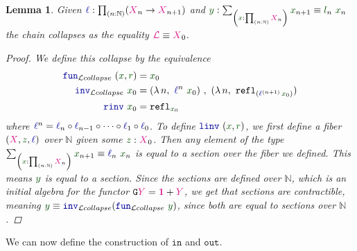 \documentclass[twoside,11pt,openright]{report}
\theoremstyle{plain} %
\newtheorem{lem}[thm]{Lemma}
\theoremstyle{definition}
\theoremstyle{remark}
\newcommand*{\term}[1]{\textcolor{green!30!black}{#1}} %
\newcommand*{\pathterm}[1]{\textcolor{green!40!black}{#1}}
\newcommand*{\type}[1]{\textcolor{magenta!90!black}{#1}}
\newcommand*{\unit}{\type{\textbf{1}}}
\newcommand*{\function}[1]{\textcolor{blue!60!black}{\ensuremath{\mathtt{#1}}}}
\newcommand*{\functor}[1]{\ensuremath{\mathbf{\mathtt{#1}}}}
\begin{document}
\begin{lem}\label{lem:limit-collapse}
  Given \(\function{\ell} : \prod_{(n : \mathbb{N})} (\type{X}_{n} \rightarrow \type{X}_{n+1})\) and \(\term{y} : \sum_{\left(\term{x} : \prod_{(n : \mathbb{N})} \type{X}_n\right)} \term{x}_{n + 1} \equiv \term{l}_n~\term{x}_n\) the chain collapses as the equality \(\type{\mathcal{L}} \equiv \type{X}_0\).
  \begin{proof}
    We define this collapse by the equivalence
    \begin{align}
      \function{fun}_{\mathcal{L}collapse}~(\term{x} , \pathterm{r}) &= \term{x}_0 \\
      \function{inv}_{\mathcal{L}collapse}~\term{x}_0 &= (\lambda\,n,~\function{\ell}^n~\term{x}_0)~,~(\lambda\,n,~\mathtt{refl}_{(\function{\ell}^{(n+1)}\,\term{x}_0)}) \\
      \function{rinv}~\term{x}_0 &= \mathtt{refl}_{\term{x}_0}
    \end{align}
    where \(\function{\ell}^n = \function{\ell}_n \circ \function{\ell}_{n-1} \circ \dots \circ \function{\ell}_1 \circ \function{\ell}_0\). To define \(\function{linv}~(\term{x} , \pathterm{r})\), we first define a fiber \((\type{X} , \term{z}, \function{\ell})\) over \(\mathbb{N}\) given some \(\term{z} : \type{X}_0\). Then any element of the type \(\sum_{\left(\term{x} : \prod_{(n : \mathbb{N})} \type{X}_n\right)} \term{x}_{n + 1} \equiv \function{\ell}_n~\term{x}_n\) is equal to a section over the fiber we defined. This means \(\term{y}\) is equal to a section. Since the sections are defined over \(\mathbb{N}\), which is an initial algebra for the functor \(\functor{G}\type{Y} = \unit + \type{Y}\), we get that sections are contractible, meaning \(\term{y} \equiv \function{inv}_{\mathcal{L}collapse} (\function{fun}_{\mathcal{L}collapse}~\term{y})\), since both are equal to sections over \(\mathbb{N}\).
\end{proof}
\end{lem}
\noindent We can now define the construction of \function{in} and \function{out}.
\end{document}
